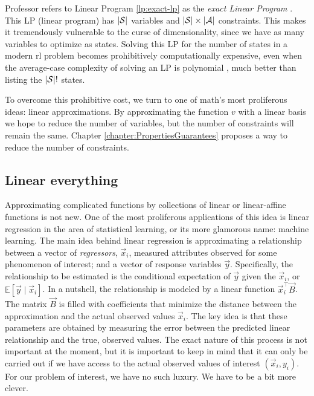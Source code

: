 Professor \citeauthor{farias2002thesis} refers to Linear Program
\eqref{lp:exact-lp} as the \textit{exact Linear Program}
\cite[Ch.~2.3]{farias2002thesis}. This LP (linear program) has $|\mathcal{S}|$
variables and $|\mathcal{S}| \times |\mathcal{A}|$ constraints. This makes it
tremendously vulnerable to the curse of dimensionality, since we have as many
variables to optimize as states. Solving this LP for the number of states in a
modern \ac{rl} problem becomes prohibitively computationally expensive, even
when the average-case complexity of solving an LP is polynomial
\cite[pg.~147]{kochenderfer2022}, much better than listing the $|\mathcal{S}|!$
states.

To overcome this prohibitive cost, we turn to one of math's most proliferous
ideas: linear approximations. By approximating the function $v$ with a linear
basis we hope to reduce the number of variables, but the number of constraints
will remain the same. Chapter \ref{chapter:PropertiesGuarantees} proposes a way
to reduce the number of constraints.

\subsection{Linear everything}

Approximating complicated functions by collections of linear or linear-affine
functions is not new. One of the most proliferous applications of this idea is
linear regression in the area of statistical learning, or its more glamorous
name: machine learning. The main idea behind linear regression is approximating
a relationship between a vector of \textit{regressors}, $\vec{x}_i$, measured
attributes observed for some phenomenon of interest; and a vector of response
variables $\vec{y}$. Specifically, the relationship to be estimated is the
conditional expectation of $\vec{y}$ given the $\vec{x}_i$, or $\mathbb{E}
\left[ \vec{y} \mid \vec{x}_i \right]$. In a nutshell, the relationship is
modeled by a linear function $\vec{x}_{i}^{\top} \vec{B}$. The matrix $\vec{B}$
is filled with coefficients that minimize the distance between the approximation
and the actual observed values $\vec{x}_i$. The key idea is that these
parameters are obtained by measuring the error between the predicted linear
relationship and the true, observed values. The exact nature of this process is
not important at the moment, but it is important to keep in mind that it can
only be carried out if we have access to the actual observed values of interest
$(\vec{x}_i, y_i)$. For our problem of interest, we have no such luxury. We have
to be a bit more clever.

